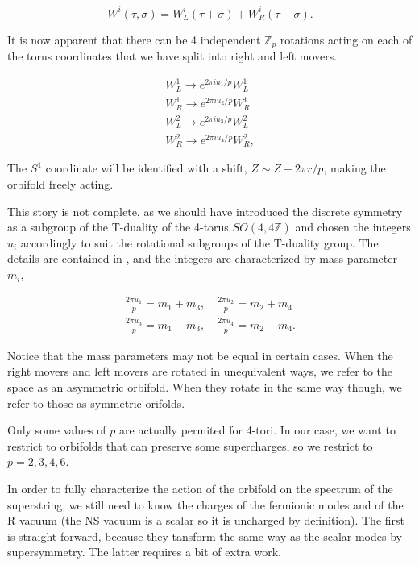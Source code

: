 \begin{equation}
    W^i(\tau,\sigma)=W_{L}^i(\tau+\sigma)+W_{R}^i(\tau-\sigma).
\end{equation}

It is now apparent that there can be 4 independent $\mathbb{Z}_p$ rotations acting on each of the torus coordinates that we have split into right and left movers.

\begin{equation}
    \label{eq:4_scalar_orb_action}
    \begin{gathered}
W_{L}^{1}\rightarrow e^{2\pi iu_{1}/p}W_{L}^{1} \\
W_{R}^{1}\rightarrow e^{2\pi iu_{2}/p}W_{R}^{1} \\
W_{L}^{2}\rightarrow e^{2\pi iu_{3}/p}W_{L}^{2} \\
W_{R}^2\to e^{2\pi iu_4/p}W_{R}^2, 
\end{gathered}
\end{equation}

The $S^1$ coordinate will be identified with a shift, $Z \sim Z+2\pi r/p$, making the  orbifold freely acting.

This story is not complete, as we should have introduced the discrete symmetry as a subgroup of the T-duality of the 4-torus $SO(4,4\mathbb{Z})$ and chosen the integers $u_i$ accordingly to suit the rotational subgroups of the T-duality group. The details are contained in \cite{gkountoumis2023freely,Stemerdink:2022hnf}, and the integers are characterized by mass parameter $m_i$,

\begin{align}
    \frac{2\pi u_1}p=m_1+m_3,\quad\frac{2\pi u_2}p=m_2+m_4\\\frac{2\pi u_3}p=m_1-m_3,\quad\frac{2\pi u_4}p=m_2-m_4.
\end{align}

Notice that the mass parameters may not be equal in certain cases. When the right movers and left movers are rotated in unequivalent ways, we refer to the space as an asymmetric orbifold. When they rotate in the same way though, we refer to those as symmetric orifolds.

Only some values of $p$ are actually permited for 4-tori. In our case, we want to restrict to orbifolds that can preserve some supercharges, so we restrict to $p = 2,3,4,6$.

In order to fully characterize the action of the orbifold on the spectrum of the superstring, we still need to know the charges of the fermionic modes and of the R vacuum (the NS vacuum is a scalar so it is uncharged by definition). The first is straight forward, because they tansform the same way as the scalar modes by supersymmetry. The latter requires a bit of extra work.

